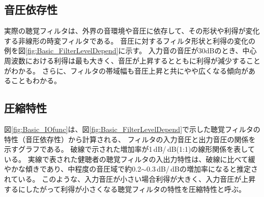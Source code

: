 

\newpage
\subsection{音圧依存性}
\label{sec:FilterLevelDepend}
実際の聴覚フィルタは、外界の音環境や音圧に依存して、その形状や利得が変化する非線形の時変フィルタである。
音圧に対するフィルタ形状と利得の変化の例を図\ref{fig:Basic_FilterLevelDepend}に示す。
入力音の音圧が30dBのとき、中心周波数における利得は最も大きく、音圧が上昇するとともに利得が減少することがわかる。
さらに、フィルタの帯域幅も音圧上昇と共にやや広くなる傾向があることもわかる。
    
\subsection{圧縮特性}
\label{sec:IOfunc}
図\ref{fig:Basic_IOfunc}は、図\ref{fig:Basic_FilterLevelDepend}で示した聴覚フィルタの特性（音圧依存性）から計算される、
フィルタの入力音圧と出力音圧の関係を示すグラフである。
破線で示された増加率が1\,dB/\,dB(1:1)の線形関係を表している。
実線で表された健聴者の聴覚フィルタの入出力特性は、破線に比べて緩やかな傾きであり、中程度の音圧域で約0.2$\sim$0.3\,dB/\,dBの増加率になると推定されている。
このような、入力音圧が小さい場合利得が大きく、入力音圧が上昇するにしたがって利得が小さくなる聴覚フィルタの特性を圧縮特性と呼ぶ。

